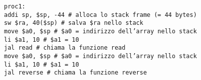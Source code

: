 \documentclass[../main.tex]{subfiles}
\begin{document}
\begin{table}[h!]
    \begin{minipage}{.75\linewidth}
        \texttt{proc1: \\
            \hspace*{0cm} \hspace*{0cm} addi sp, \$sp, -44 \# alloca lo stack frame (= 44 bytes) \\
            \hspace*{0cm} \hspace*{0cm} sw \$ra, 40(\$sp) \hspace*{0cm} \hspace*{0cm} \# salva \$ra nello stack \\
            \hspace*{0cm} \hspace*{0cm} move \$a0, \$sp \# \$a0 = indirizzo dell'array nello stack \\
            \hspace*{0cm} \hspace*{0cm} li \$a1, 10 \hspace*{0cm} \hspace*{0cm} \hspace*{0cm} \# \$a1 = 10 \\
            \hspace*{0cm} \hspace*{0cm} jal read \hspace*{0cm} \hspace*{0cm} \hspace*{0cm} \hspace*{0cm} \hspace*{0cm} \# chiama la funzione read \\
            \hspace*{0cm} \hspace*{0cm} move \$a0, \$sp \# \$a0 = indirizzo dell'array nello stack \\
            \hspace*{0cm} \hspace*{0cm} li \$a1, 10 \hspace*{0cm} \hspace*{0cm} \hspace*{0cm} \# \$a1 = 10 \\
            \hspace*{0cm} \hspace*{0cm} jal reverse \hspace*{0cm} \hspace*{0cm} \# chiama la funzione reverse \\
}
\end{minipage}
\end{table}
\end{document}
